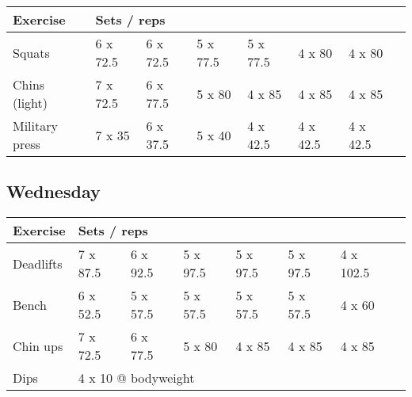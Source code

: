 \documentclass[12pt, a4paper]{article}%
\begin{document}
  \begin{tabular}{l|lllllll}
  \hspace{0.75em} \textbf{Exercise} & \multicolumn{ 7 }{l}{ \textbf{Sets / reps} } \\ \hline

            \hspace{0.75em} Squats
            & 6 x 72.5
            & 6 x 72.5
            & 5 x 77.5
            & 5 x 77.5
            & 4 x 80
            & 4 x 80
            & 
            \\


            \hspace{0.75em} Chins (light)
            & 7 x 72.5
            & 6 x 77.5
            & 5 x 80
            & 4 x 85
            & 4 x 85
            & 4 x 85
            & 
            \\


            \hspace{0.75em} Military press
            & 7 x 35
            & 6 x 37.5
            & 5 x 40
            & 4 x 42.5
            & 4 x 42.5
            & 4 x 42.5
            & 
            \\


  \end{tabular}

  \subsection*{\hspace{0.5em} Wednesday }


  \begin{tabular}{l|lllllll}
  \hspace{0.75em} \textbf{Exercise} & \multicolumn{ 7 }{l}{ \textbf{Sets / reps} } \\ \hline

            \hspace{0.75em} Deadlifts
            & 7 x 87.5
            & 6 x 92.5
            & 5 x 97.5
            & 5 x 97.5
            & 5 x 97.5
            & 4 x 102.5
            & 
            \\


            \hspace{0.75em} Bench
            & 6 x 52.5
            & 5 x 57.5
            & 5 x 57.5
            & 5 x 57.5
            & 5 x 57.5
            & 4 x 60
            & 
            \\


            \hspace{0.75em} Chin ups
            & 7 x 72.5
            & 6 x 77.5
            & 5 x 80
            & 4 x 85
            & 4 x 85
            & 4 x 85
            & 
            \\


   \hspace{0.75em} Dips &  \multicolumn{ 7 }{l}{ 4 x 10 @ bodyweight } \\
  \end{tabular}
\end{document}
